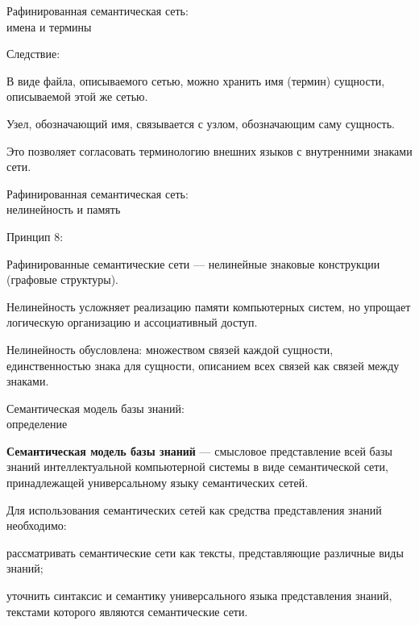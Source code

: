 \begin{frame}{Рафинированная семантическая сеть:\\имена и термины}
	\topline
	\justifying
	
	Следствие:
	\begin{textitemize}
		\item В виде файла, описываемого сетью, можно хранить имя (термин) сущности, описываемой этой же сетью.
		\item Узел, обозначающий имя, связывается с узлом, обозначающим саму сущность.
		\item Это позволяет согласовать терминологию внешних языков с внутренними знаками сети.
	\end{textitemize}
	
\end{frame}


\begin{frame}{Рафинированная семантическая сеть:\\нелинейность и память}
	\topline
	\justifying
	
	Принцип 8:
	\begin{textitemize}
		\item Рафинированные семантические сети --- нелинейные знаковые конструкции (графовые структуры).
		\item Нелинейность усложняет реализацию памяти компьютерных систем, но упрощает логическую организацию и ассоциативный доступ.
	\end{textitemize}
	
	\medskip
	Нелинейность обусловлена: множеством связей каждой сущности, единственностью знака для сущности, описанием всех связей как связей между знаками.
	
\end{frame}


\begin{frame}{Семантическая модель базы знаний:\\определение}
	\topline
	\justifying
	
	\textbf{Семантическая модель базы знаний} --- смысловое представление всей базы знаний интеллектуальной компьютерной системы в виде семантической сети, принадлежащей универсальному языку семантических сетей.
	
	\medskip
	Для использования семантических сетей как средства представления знаний необходимо:
	\begin{textitemize}
		\item рассматривать семантические сети как тексты, представляющие различные виды знаний;
		\item уточнить синтаксис и семантику универсального языка представления знаний, текстами которого являются семантические сети.
	\end{textitemize}
	
\end{frame}


